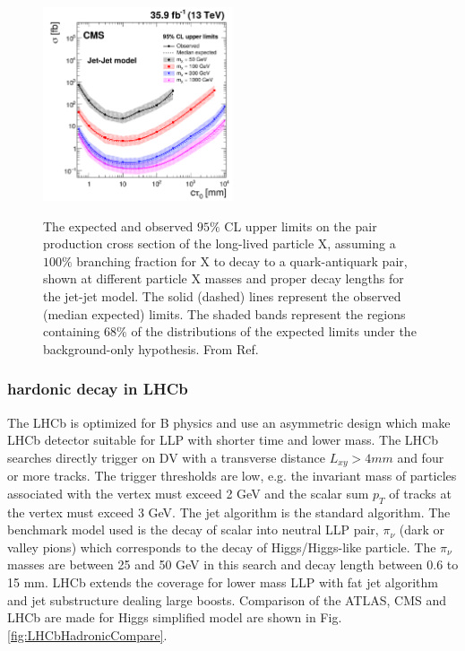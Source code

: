 \begin{figure}
    \centering
    \caption{The expected and observed $95\%$ CL upper limits on the pair production cross section of the long-lived particle X, assuming a $100\%$ branching fraction for X to decay to a quark-antiquark pair, shown at different particle X masses and proper decay lengths for the jet-jet model. The solid (dashed) lines represent the observed (median expected) limits. The shaded bands represent the regions containing $68\%$ of the distributions of the expected limits under the background-only hypothesis. From Ref. \cite{Sirunyan:2018vlw}}
    \includegraphics[width=0.5\textwidth]{fig/CMShardonic.png}
    \label{fig:CMSjetjet}
\end{figure}





\subsubsection{hardonic decay in LHCb}
The LHCb is optimized for B physics and use an asymmetric design which make LHCb detector suitable for LLP with shorter time and lower mass. The LHCb searches directly trigger on DV with a transverse distance $L_{xy} > 4mm$ and four or more tracks. The trigger thresholds are low, e.g. the invariant mass of particles associated with the vertex must exceed 2 GeV and the scalar sum $p_T$ of tracks at the vertex must exceed 3 GeV. The jet algorithm is the standard algorithm. The benchmark model used is the decay of scalar into neutral LLP pair, $\pi_{\nu}$ (dark or valley pions) which corresponds to the decay of Higgs/Higgs-like particle. The $\pi_{\nu}$  masses are between 25 and 50 GeV in this search and decay length between 0.6 to 15 mm. LHCb extends the coverage for lower mass LLP with fat jet algorithm and jet  substructure dealing large boosts. Comparison of the ATLAS, CMS and LHCb are made for Higgs simplified model are shown in Fig. \ref{fig:LHCbHadronicCompare}.

